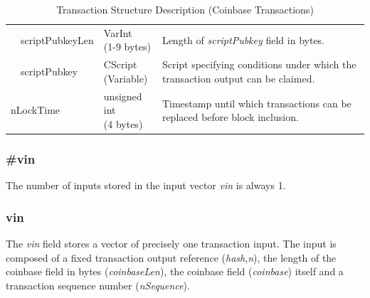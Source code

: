\begin{table}[ht!]
\begin{tabularx}{\textwidth}{ | m{30pt} | m{70pt} | >{\centering} m{60pt} | X |}
		& scriptPubkeyLen &
		\bigcell{c}{VarInt \\ (1-9 bytes)} &
		Length of \textit{scriptPubkey} field in bytes. \\ \cline{2-4}

		& scriptPubkey &
		\bigcell{c}{CScript \\ (Variable)} &
		Script specifying conditions under which the transaction output can be claimed. \\ \hline
    	
    	\multicolumn{2}{|l|}{nLockTime} &
    	\bigcell{c}{unsigned int \\ (4 bytes)} &
    	Timestamp until which transactions can be replaced before block inclusion.\\ \hline
	
	\end{tabularx}
	\vspace{5pt}
	\caption{Transaction Structure Description (Coinbase Transactions)}
	\label{tab:TransactionCoinbase}
\end{table}
\vspace{-20pt}

\subsubsection*{\#vin}
The number of inputs stored in the input vector \textit{vin} is always 1.

\subsubsection*{vin}
The \textit{vin} field stores a vector of precisely one transaction input. The input is composed of a fixed transaction output reference (\textit{hash},\textit{n}), the length of the coinbase field in bytes (\textit{coinbaseLen}), the coinbase field (\textit{coinbase}) itself and a transaction sequence number (\textit{nSequence}).

